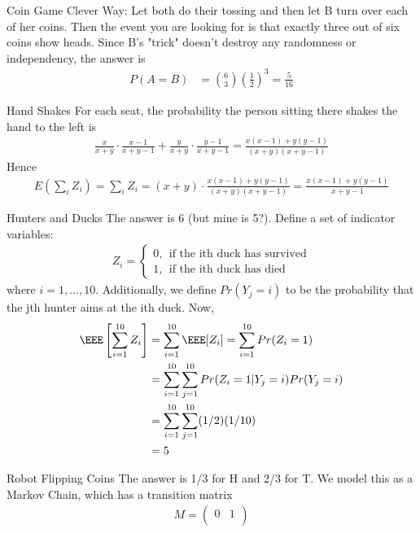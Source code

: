 \documentclass[oldfontcommands]{memoir}
\begin{document}
{\begin{answer}{Coin Game}
Clever Way: Let both do their tossing and then let B turn over each of her coins. Then the event you are looking for is that exactly three out of six coins show heads. Since B's "trick" doesn't destroy any randomness or independency, the answer is
\begin{align}
	P(A=B) &= \binom{6}{3} \left(\frac{1}{2}\right)^3 = \frac{5}{16}
\end{align}
\end{answer}
\begin{answer}{Hand Shakes}
For each seat, the probability the person sitting there shakes the hand to the left is
\begin{align}
	\frac{x}{x+y} \cdot \frac{x-1}{x+y-1} + \frac{y}{x+y} \cdot \frac{y-1}{x+y-1} = \frac{x(x-1) + y(y-1)}{(x+y)(x+y-1)}
\end{align}
Hence
\begin{align}
	E\left(\sum_i Z_i\right) = \sum_i Z_i = (x+y) \cdot \frac{x(x-1) + y(y-1)}{(x+y)(x+y-1)} = \frac{x(x-1) + y(y-1)}{x+y-1}
\end{align}\end{answer}
\begin{answer}{Hunters and Ducks}
The answer is 6 (but mine is 5?). Define a set of indicator variables:
\begin{align*}
    Z_i = \begin{cases} 
    0, ~~ \mbox{if the ith duck has survived}\\
    1, ~~ \mbox{if the ith duck has died}		
    \end{cases}
\end{align*}
where $i = 1, \dots, 10$. Additionally, we define $Pr(Y_j = i)$ to be the probability that the jth hunter aims at the ith duck. Now,
\begin{align*}
    \EEE\left[\sum_{i=1}^{10} Z_i\right] &= \sum_{i=1}^{10} \EEE[Z_i] = \sum_{i=1}^{10} Pr(Z_i=1)\\
    &= \sum_{i=1}^{10} \sum_{j=1}^{10} Pr(Z_i=1|Y_j = i) Pr(Y_j = i)\\
    &= \sum_{i=1}^{10} \sum_{j=1}^{10} (1/2)(1/10)\\
    &= 5		
\end{align*}\end{answer}
\begin{answer}{Robot Flipping Coins}
The answer is 1/3 for H and 2/3 for T. We model this as a Markov Chain, which has a transition matrix
\begin{align*}
    M = 
    \begin{pmatrix}
        0 & 1\\

\end{pmatrix}
\end{align*}
\end{answer}}
\end{document}
